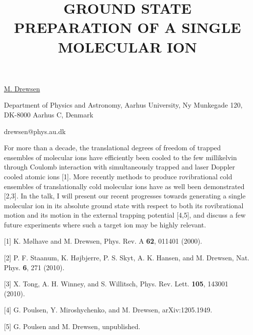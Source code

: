 \title{GROUND STATE PREPARATION OF A SINGLE MOLECULAR ION}

\underline{M. Drewsen} 

{\normalsize{\vspace{-4mm}
Department of Physics and Astronomy,
Aarhus University,
Ny Munkegade 120,
DK-8000 Aarhus C,
Denmark

\email drewsen@phys.au.dk}}

For more than a decade, the translational degrees of freedom of trapped ensembles of molecular ions have efficiently been cooled to the few millikelvin through Coulomb interaction with simultaneously trapped and laser Doppler cooled atomic ions [1]. More recently methods to produce rovibrational cold ensembles of translationally cold molecular ions have as well been demonstrated [2,3]. In the talk, I will present our recent progresses towards generating a single molecular ion in its absolute ground state with respect to both its rovibrational motion and its motion in the external trapping potential [4,5], and discuss a few future experiments where such a target ion may be highly relevant.

{\normalsize
[1] K. M{\o}lhave and M. Drewsen, Phys. Rev. A \textbf{62}, 011401 (2000).
\vsp

[2] P. F. Staanum, K. H{\o}jbjerre, P. S. Skyt, A. K. Hansen, and M. Drewsen, Nat. Phys. \textbf{6}, 271 (2010).
\vsp

[3] X. Tong, A. H. Winney, and S. Willitsch, Phys. Rev. Lett. \textbf{105}, 143001 (2010).
\vsp

[4] G. Poulsen, Y. Miroshychenko, and M. Drewsen, arXiv:1205.1949.
\vsp

[5] G. Poulsen and M. Drewsen, unpublished.
}

\vspace{\baselineskip} 